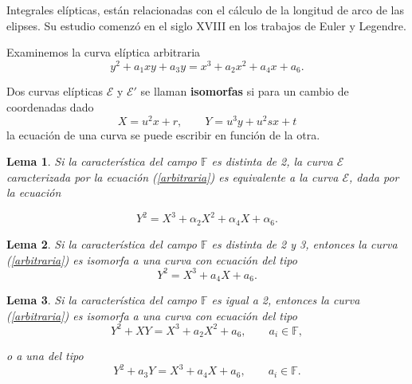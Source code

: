 \documentclass[12pt,oneside]{book}
\newtheorem{lema}{Lema}
\begin{document}
Integrales el\'ipticas, est\'an relacionadas con el c\'alculo de la longitud de arco de las elipses. Su estudio comenz\'o en el siglo XVIII en los trabajos de Euler y Legendre.

Examinemos la curva el\'iptica arbitraria
\begin{equation}\label{arbitraria}
y^2 + a_1 xy + a_3 y = x^3 + a_2 x^2 + a_4 x + a_6.
\end{equation}

Dos curvas el\'ipticas $\mathcal{E}$ y $\mathcal{E'}$ se llaman \textbf{isomorfas} si para un cambio de coordenadas dado
$$X=u^2 x + r, \qquad Y= u^3 y + u^2 sx + t$$
la ecuaci\'on de una curva se puede escribir en funci\'on de la otra.


%

\begin{lema}
Si la caracter\'istica del campo $\mathbb{F}$ es distinta de 2, la curva $\mathcal{E}$ caracterizada por la ecuaci\'on (\ref{arbitraria}) es equivalente a la curva $\mathcal{E}$, dada por la ecuaci\'on

\begin{equation}\label{arbitraria_eqv}
Y^2 = X^3 + \alpha_2 X^2 + \alpha_4 X + \alpha_6.
\end{equation}
\end{lema}



\begin{lema}
Si la caracter\'istica del campo $\mathbb{F}$ es distinta de 2 y 3, entonces la curva (\ref{arbitraria}) es isomorfa a una curva con ecuaci\'on del tipo
\begin{equation}\label{arbitraria_isom}
Y^2 = X^3 + a_4 X + a_6.
\end{equation}
\end{lema}



\begin{lema}
Si la caracter\'istica del campo $\mathbb{F}$ es igual a 2, entonces la curva (\ref{arbitraria}) es isomorfa a una curva con ecuaci\'on del tipo
\begin{equation}\label{arbitraria_isom_1}
Y^2 + XY= X^3 + a_2 X^2 + a_6, \qquad a_i\in\mathbb{F},
\end{equation}

o a una del tipo 
\begin{equation}\label{arbitraria_isom_2}
Y^2 + a_3 Y= X^3 + a_4 X + a_6, \qquad a_i\in\mathbb{F}.
\end{equation}
\end{lema}
\end{document}
